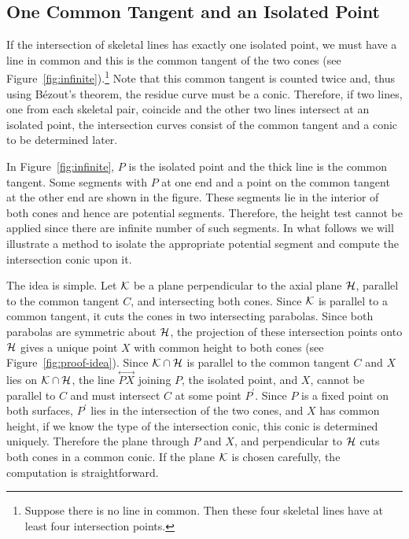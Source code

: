 
\subsection{One Common Tangent and an Isolated Point}
\label{section:one-coincide-line}
     If the intersection of skeletal lines has exactly one isolated point, we
must have a line in common and this is the common tangent of the two cones
(see Figure~\ref{fig:infinite}).\footnote{Suppose there is no line in common. 
Then these four skeletal lines have at least four intersection points.}  Note
that this common tangent is counted twice and, thus using B\'{e}zout's
theorem, the residue curve must be a conic.  Therefore, if two lines, one from
each skeletal pair, coincide and the other two lines intersect at an isolated 
point, the intersection curves consist of the common tangent and a conic to be 
determined later.

     In Figure~\ref{fig:infinite}, $P$ is the isolated point and the thick line
is the common tangent.  Some segments with $P$ at one end and a point on the 
common tangent at the other end are shown in the figure.  These segments lie in
the interior of both cones and hence are potential segments.  Therefore, the 
height test cannot be applied since there are infinite number of such segments.
In what follows we will illustrate a method to isolate the appropriate 
potential segment and compute the intersection conic upon it.

     The idea is simple.  Let ${\cal K}$ be a plane perpendicular to the axial
plane ${\cal H}$, parallel to the common tangent $C$, and intersecting both 
cones.  Since ${\cal K}$ is parallel to a common tangent, it cuts
the cones in two intersecting parabolas.  Since both parabolas are symmetric 
about ${\cal H}$, the projection of these intersection points onto ${\cal H}$ 
gives a unique point $X$ with common height to both cones (see 
Figure~\ref{fig:proof-idea}).  Since ${\cal K}\cap{\cal H}$ is parallel to the
common tangent $C$ and $X$ lies on ${\cal K}\cap{\cal H}$, the line 
$\stackrel{\longleftrightarrow}{PX}$ joining $P$, the isolated point, and $X$,
cannot be parallel to $C$ and must intersect $C$ at some point $P^\prime$.
Since $P$ is a fixed point on both surfaces, $P^\prime$ lies in the 
intersection of the two cones, and $X$ has common height, if we know the type 
of the intersection conic, this conic is determined uniquely.  Therefore the 
plane through $P$ and $X$, and perpendicular to ${\cal H}$ cuts both cones in 
a common conic.  If the plane ${\cal K}$ is chosen carefully, the computation 
is straightforward.

